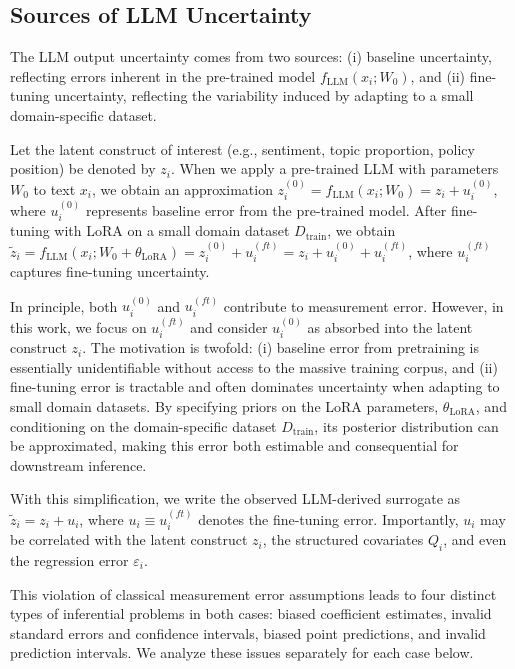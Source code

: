 \documentclass[11pt]{article}
\begin{document}
\subsection{Sources of LLM Uncertainty}
The LLM output uncertainty comes from two sources: (i) baseline uncertainty, reflecting errors inherent in the pre-trained model $f_{\text{LLM}}(x_i; W_0)$, and (ii) fine-tuning uncertainty, reflecting the variability induced by adapting to a small domain-specific dataset.

Let the latent construct of interest (e.g., sentiment, topic proportion, policy position) be denoted by $z_i$. When we apply a pre-trained LLM with parameters $W_0$ to text $x_i$, we obtain an approximation $z_i^{(0)} = f_{\text{LLM}}(x_i; W_0) = z_i + u_i^{(0)}$, where $u_i^{(0)}$ represents baseline error from the pre-trained model. After fine-tuning with LoRA on a small domain dataset $D_{\text{train}}$, we obtain $\tilde{z}_i = f_{\text{LLM}}(x_i; W_0 + \theta_{\text{LoRA}}) = z_i^{(0)} + u_i^{(ft)} = z_i + u_i^{(0)} + u_i^{(ft)}$, where $u_i^{(ft)}$ captures fine-tuning uncertainty.

In principle, both $u_i^{(0)}$ and $u_i^{(ft)}$ contribute to measurement error. However, in this work, we focus on $u_i^{(ft)}$ and consider $u_i^{(0)}$ as absorbed into the latent construct $z_i$. The motivation is twofold: (i) baseline error from pretraining is essentially unidentifiable without access to the massive training corpus, and (ii) fine-tuning error is tractable and often dominates uncertainty when adapting to small domain datasets. By specifying priors on the LoRA parameters, $\theta_{\text{LoRA}}$, and conditioning on the domain-specific dataset $D_{\text{train}}$, its posterior distribution can be approximated, making this error both estimable and consequential for downstream inference.

With this simplification, we write the observed LLM-derived surrogate as $\tilde{z}_i = z_i + u_i$, where $u_i \equiv u_i^{(ft)}$ denotes the fine-tuning error. 
Importantly, $u_i$ may be correlated with the latent construct $z_i$, the structured covariates $Q_i$, and even the regression error $\varepsilon_i$.

This violation of classical measurement error assumptions leads to four distinct types of inferential problems in both cases:
biased coefficient estimates, invalid standard errors and confidence intervals, biased point predictions, and invalid prediction intervals.
We analyze these issues separately for each case below.
\end{document}

